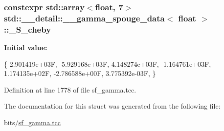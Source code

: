\subsubsection[{\texorpdfstring{\+\_\+\+S\+\_\+cheby}{_S_cheby}}]{\setlength{\rightskip}{0pt plus 5cm}constexpr std\+::array$<$float, 7$>$ {\bf std\+::\+\_\+\+\_\+detail\+::\+\_\+\+\_\+gamma\+\_\+spouge\+\_\+data}$<$ float $>$\+::\+\_\+\+S\+\_\+cheby\hspace{0.3cm}{\ttfamily [static]}}\hypertarget{structstd_1_1____detail_1_1____gamma__spouge__data_3_01float_01_4_a7ea259a3aade6eb09d994482b687c515}{}\label{structstd_1_1____detail_1_1____gamma__spouge__data_3_01float_01_4_a7ea259a3aade6eb09d994482b687c515}
{\bfseries Initial value\+:}
\begin{DoxyCode}
\{
     2.901419e+03F,
    -5.929168e+03F,
     4.148274e+03F,
    -1.164761e+03F,
     1.174135e+02F,
    -2.786588e+00F,
     3.775392e-03F,
      \}
\end{DoxyCode}


Definition at line 1778 of file sf\+\_\+gamma.\+tcc.



The documentation for this struct was generated from the following file\+:\begin{DoxyCompactItemize}
\item 
bits/\hyperlink{sf__gamma_8tcc}{sf\+\_\+gamma.\+tcc}\end{DoxyCompactItemize}
